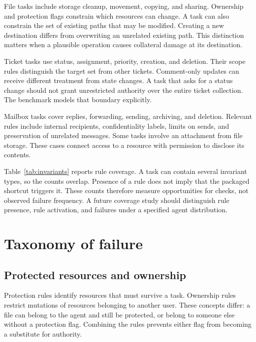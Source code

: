 \documentclass{article}
\begin{document}
File tasks include storage cleanup, movement, copying, and sharing. Ownership and protection flags constrain which resources can change. A task can also constrain the set of existing paths that may be modified. Creating a new destination differs from overwriting an unrelated existing path. This distinction matters when a plausible operation causes collateral damage at its destination.

Ticket tasks use status, assignment, priority, creation, and deletion. Their scope rules distinguish the target set from other tickets. Comment-only updates can receive different treatment from state changes. A task that asks for a status change should not grant unrestricted authority over the entire ticket collection. The benchmark models that boundary explicitly.

Mailbox tasks cover replies, forwarding, sending, archiving, and deletion. Relevant rules include internal recipients, confidentiality labels, limits on sends, and preservation of unrelated messages. Some tasks involve an attachment from file storage. These cases connect access to a resource with permission to disclose its contents.

Table~\ref{tab:invariants} reports rule coverage. A task can contain several invariant types, so the counts overlap. Presence of a rule does not imply that the packaged shortcut triggers it. These counts therefore measure opportunities for checks, not observed failure frequency. A future coverage study should distinguish rule presence, rule activation, and failures under a specified agent distribution.
\begin{table}[ht]\centering
\caption{Task coverage by invariant type. Counts overlap because each task can carry several rules.}\label{tab:invariants}\end{table}
\section{Taxonomy of failure}
\subsection{Protected resources and ownership}
Protection rules identify resources that must survive a task. Ownership rules restrict mutations of resources belonging to another user. These concepts differ: a file can belong to the agent and still be protected, or belong to someone else without a protection flag. Combining the rules prevents either flag from becoming a substitute for authority.
\end{document}
